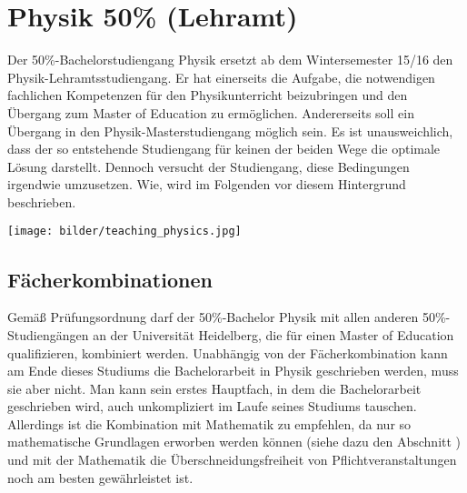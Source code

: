 \section{Physik 50\% (Lehramt)} %

Der 50\%-Bachelorstudiengang Physik ersetzt ab dem Wintersemester 15/16 den Physik-Lehramtsstudiengang. Er hat einerseits die Aufgabe, die notwendigen fachlichen Kompetenzen für den Physikunterricht beizubringen und den Übergang zum Master of Education zu ermöglichen. Andererseits soll ein Übergang in den Physik-Masterstudiengang möglich sein. Es ist unausweichlich, dass der so entstehende Studiengang für keinen der beiden Wege die optimale Lösung darstellt. Dennoch versucht der Studiengang, diese Bedingungen irgendwie umzusetzen. Wie, wird im Folgenden vor diesem Hintergrund beschrieben.

\begin{figure*}[b]
    \centering
    \texttt{[image: bilder/teaching\_physics.jpg]}
\end{figure*}

\subsection{Fächerkombinationen}

Gemäß Prüfungsordnung darf der 50\%-Bachelor Physik mit allen anderen 50\%-Studiengängen an der Universität Heidelberg, die für einen Master of Education qualifizieren, kombiniert werden. Unabhängig von der Fächerkombination kann am Ende dieses Studiums die Bachelorarbeit in Physik geschrieben werden, muss sie aber nicht. Man kann sein erstes Hauptfach, in dem die Bachelorarbeit geschrieben wird, auch unkompliziert im Laufe seines Studiums tauschen. Allerdings ist die Kombination mit Mathematik zu empfehlen, da nur so mathematische Grundlagen erworben werden können (siehe dazu den Abschnitt ) und mit der Mathematik die Überschneidungsfreiheit von Pflichtveranstaltungen noch am besten gewährleistet ist.

